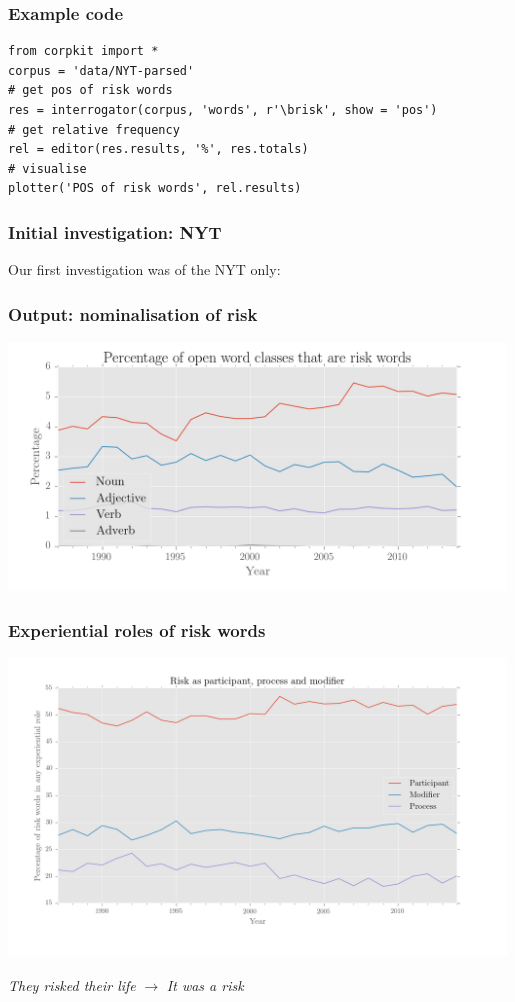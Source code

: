 \documentclass{beamer}       %
\begin{document}
\begin{frame}[fragile]
\frametitle{Example code}

\begin{verbatim}
from corpkit import *
corpus = 'data/NYT-parsed'
# get pos of risk words
res = interrogator(corpus, 'words', r'\brisk', show = 'pos')
# get relative frequency
rel = editor(res.results, '%', res.totals)
# visualise
plotter('POS of risk words', rel.results)
\end{verbatim}

\end{frame}

\begin{frame}
\frametitle{Initial investigation: NYT}

Our first investigation was of the NYT only:

\end{frame}

\begin{frame}
    \frametitle{Output: nominalisation of risk}
    \centering
    \includegraphics[width=0.99\textwidth]{../../images/percentage-of-open-word-classes-that-are-risk-words}
\end{frame}

\begin{frame}
    \frametitle{Experiential roles of risk words}
    \centering
    \includegraphics[width=0.99\textwidth]{../../images/ppm_final_colour}

    \noindent \emph{They risked their life} $\rightarrow$ \emph{It was a risk}
\end{frame}
\end{document}
